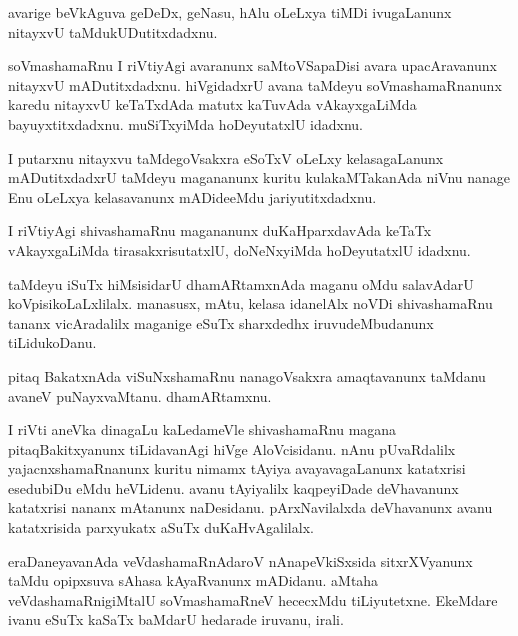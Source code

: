 \documentclass{article}
\begin{document}
\begin{mn}
avarige beVkAguva geDeDx, geNasu, hAlu oLeLxya tiMDi ivugaLanunx 
nitayxvU taMdukUDutitxdadxnu.
\end{mn}

\begin{mn}
soVmashamaRnu I riVtiyAgi avaranunx saMtoVSapaDisi avara upacAravanunx 
nitayxvU mADutitxdadxnu. hiVgidadxrU avana taMdeyu soVmashamaRnanunx 
karedu nitayxvU keTaTxdAda matutx kaTuvAda vAkayxgaLiMda bayuyxtitxdadxnu.
muSiTxyiMda hoDeyutatxlU idadxnu. 
\end{mn}

\begin{mn}
I putarxnu nitayxvu taMdegoVsakxra eSoTxV oLeLxy kelasagaLanunx 
mADutitxdadxrU taMdeyu magananunx kuritu kulakaMTakanAda niVnu nanage 
Enu oLeLxya kelasavanunx mADideeMdu jariyutitxdadxnu.
\end{mn}

\begin{mn}
I riVtiyAgi shivashamaRnu magananunx duKaHparxdavAda keTaTx vAkayxgaLiMda 
tirasakxrisutatxlU, doNeNxyiMda hoDeyutatxlU idadxnu.
\end{mn}

\begin{mn}
taMdeyu iSuTx hiMsisidarU dhamARtamxnAda maganu oMdu salavAdarU 
koVpisikoLaLxlilalx. manasusx, mAtu, kelasa idanelAlx noVDi shivashamaRnu 
tananx vicAradalilx maganige eSuTx sharxdedhx iruvudeMbudanunx tiLidukoDanu.
\end{mn}

\begin{mn}
pitaq BakatxnAda viSuNxshamaRnu nanagoVsakxra amaqtavanunx taMdanu 
avaneV puNayxvaMtanu. dhamARtamxnu.
\end{mn}

\begin{mn}
I riVti aneVka dinagaLu kaLedameVle shivashamaRnu magana pitaqBakitxyanunx 
tiLidavanAgi hiVge AloVcisidanu. nAnu pUvaRdalilx yajacnxshamaRnanunx 
kuritu nimamx tAyiya avayavagaLanunx katatxrisi esedubiDu eMdu heVLidenu.
avanu tAyiyalilx kaqpeyiDade deVhavanunx katatxrisi nananx mAtanunx naDesidanu.
pArxNavilalxda deVhavanunx avanu katatxrisida parxyukatx aSuTx duKaHvAgalilalx.
\end{mn}

\begin{mn}
eraDaneyavanAda veVdashamaRnAdaroV nAnapeVkiSxsida sitxrXVyanunx taMdu 
opipxsuva sAhasa kAyaRvanunx mADidanu. aMtaha veVdashamaRnigiMtalU
soVmashamaRneV hececxMdu tiLiyutetxne. EkeMdare ivanu eSuTx kaSaTx baMdarU
hedarade iruvanu, irali.
\end{mn}
\end{document}

